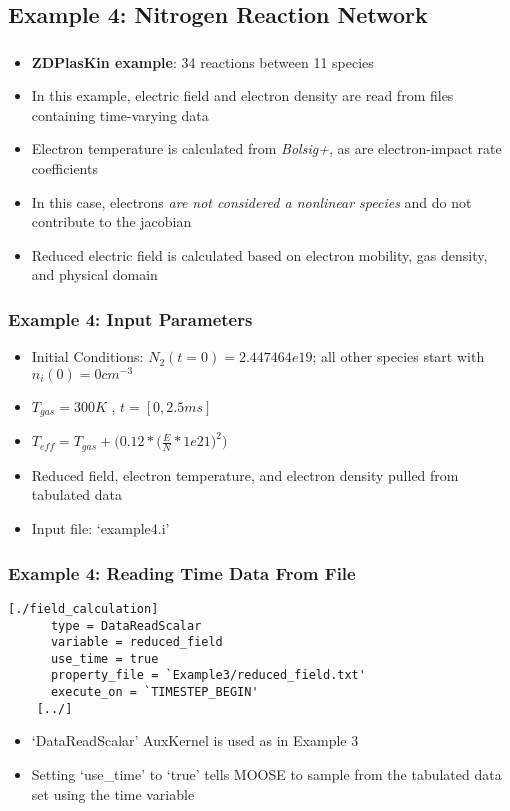 \subsection{Example 4: Nitrogen Reaction Network}
\begin{frame}[fragile]
	\frametitle{\insertsubsectionhead}
	\begin{itemize}
		\item \textbf{ZDPlasKin example}\footnotemark: 34 reactions between 11 species
		\item In this example, electric field and electron density are read from files containing time-varying data
		\item Electron temperature is calculated from \textit{Bolsig+}, as are electron-impact rate coefficients
		\item In this case, electrons \textit{are not considered a nonlinear species} and do not contribute to the jacobian
		\item Reduced electric field is calculated based on electron mobility, gas density, and physical domain
	\end{itemize}
\end{frame}




\begin{frame}[fragile]
	\frametitle{Example 4: Input Parameters}
	\begin{itemize}
		\item Initial Conditions: $N_2(t=0) = 2.447464e19$; all other species start with $n_i(0) = 0 cm^{-3}$
		\item $T_{gas} = 300 K$ , $t=[0,2.5 ms]$
		\item $T_{eff} = T_{gas}+\Big(0.12 * \Big(\tfrac{E}{N}*1e21 \Big)^2 \Big)$
		\item Reduced field, electron temperature, and electron density pulled from tabulated data 
		\item Input file: `example4.i'
	\end{itemize}
\end{frame}

\begin{frame}[fragile]
	\frametitle{Example 4: Reading Time Data From File}
	\begin{Verbatim}[fontsize=\scriptsize]
    [./field_calculation]
      type = DataReadScalar
      variable = reduced_field
      use_time = true
      property_file = `Example3/reduced_field.txt'
      execute_on = `TIMESTEP_BEGIN'
    [../]
	\end{Verbatim}
	\begin{itemize}
		\item `DataReadScalar' AuxKernel is used as in Example 3
		\item Setting `use\_time' to `true' tells MOOSE to sample from the tabulated data set using the time variable
	\end{itemize}
\end{frame}

